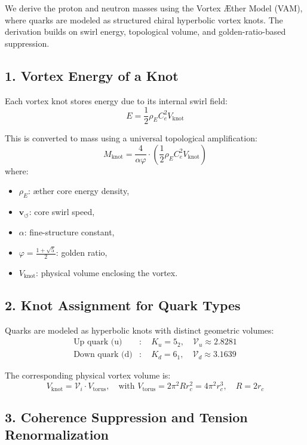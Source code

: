 \documentclass[12pt]{article}
\begin{document}
We derive the proton and neutron masses using the Vortex Æther Model (VAM), where quarks are modeled as structured chiral hyperbolic vortex knots. The derivation builds on swirl energy, topological volume, and golden-ratio-based suppression.

\subsection*{1. Vortex Energy of a Knot}

Each vortex knot stores energy due to its internal swirl field:
\[
E = \frac{1}{2} \rho_{\scriptscriptstyle\boldsymbol\!E}C_e^2 V_{\text{knot}}
\]

This is converted to mass using a universal topological amplification:
\[
\boxed{
M_{\text{knot}} = \frac{4}{\alpha \varphi} \cdot \left( \frac{1}{2} \rho_{\scriptscriptstyle\boldsymbol\!E}C_e^2 V_{\text{knot}} \right)
}
\]
where:
\begin{itemize}
  \item \( \rho_{\scriptscriptstyle\boldsymbol\!E}\): æther core energy density,
  \item \( \mathbf{v}_{\scriptscriptstyle\boldsymbol{\circlearrowleft}} \): core swirl speed,
  \item \( \alpha \): fine-structure constant,
  \item \( \varphi = \frac{1+\sqrt{5}}{2} \): golden ratio,
  \item \( V_{\text{knot}} \): physical volume enclosing the vortex.
\end{itemize}

\subsection*{2. Knot Assignment for Quark Types}

Quarks are modeled as hyperbolic knots with distinct geometric volumes:
\[
\begin{aligned}
\text{Up quark (u)} &: \quad K_u = 5_2, \quad \mathcal{V}_u \approx 2.8281 \\
\text{Down quark (d)} &: \quad K_d = 6_1, \quad \mathcal{V}_d \approx 3.1639
\end{aligned}
\]

The corresponding physical vortex volume is:
\[
V_{\text{knot}} = \mathcal{V}_i \cdot V_{\text{torus}}, \quad \text{with } V_{\text{torus}} = 2\pi^2 R r_c^2 = 4\pi^2 r_c^3, \quad R = 2r_c
\]

\subsection*{3. Coherence Suppression and Tension Renormalization}
\end{document}
